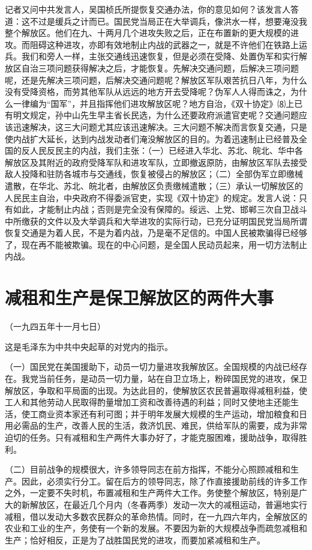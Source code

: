 \documentclass[UTF-8, a5paper, 12pt]{ctexart}
\begin{document}
记者又问中共发言人，吴国桢氏所提恢复交通办法，你的意见如何？该发言人答道：这不过是缓兵之计而已。国民党当局正在大举调兵，像洪水一样，想要淹没我整个解放区。他们在九、十两月几个进攻失败之后，正在布置新的更大规模的进攻。而阻碍这种进攻，亦即有效地制止内战的武器之一，就是不许他们在铁路上运兵。我们和旁人一样，主张交通线迅速恢复，但是必须在受降、处置伪军和实行解放区自治三项问题获得解决之后，才能恢复。先解决交通问题，后解决三项问题呢，还是先解决三项问题，后解决交通问题呢？解放区军队艰苦抗日八年，为什么没有受降资格，而劳其他军队从远远的地方开去受降呢？伪军人人得而诛之，为什么一律编为“国军”，并且指挥他们进攻解放区呢？地方自治，《双十协定》⑻上已有明文规定，孙中山先生早主省长民选，为什么还要政府派遣官吏呢？交通问题应该迅速解决，这三大问题尤其应该迅速解决。三大问题不解决而言恢复交通，只是使内战扩大延长，达到内战发动者们淹没解放区的目的。为着迅速制止已经普及全国的反人民反民主的内战，我们主张：（一）已经进入华北、苏北、皖北、华中各解放区及其附近的政府受降军队和进攻军队，立即撤返原防，由解放区军队去接受敌人投降和驻防各城市与交通线，恢复被侵占的解放区；（二）全部伪军立即缴械遣散，在华北、苏北、皖北者，由解放区负责缴械遣散；（三）承认一切解放区的人民民主自治，中央政府不得委派官吏，实现《双十协定》的规定。发言人说：只有如此，才能制止内战；否则是完全没有保障的。绥远、上党、邯郸三次自卫战斗中所缴获的文件以及大举调兵和大举进攻的实际行动，已充分证明国民党当局所谓恢复交通是为着人民，不是为着内战，乃是毫不足信的。中国人民被欺骗得已经够了，现在再不能被欺骗。现在的中心问题，是全国人民动员起来，用一切方法制止内战。

\section{减租和生产是保卫解放区的两件大事}

（一九四五年十一月七日）

这是毛泽东为中共中央起草的对党内的指示。

（一）国民党在美国援助下，动员一切力量进攻我解放区。全国规模的内战已经存在。我党当前任务，是动员一切力量，站在自卫立场上，粉碎国民党的进攻，保卫解放区，争取和平局面的出现。为达此目的，使解放区农民普遍取得减租利益，使工人和其他劳动人民取得酌量增加工资和改善待遇的利益；同时又使地主还能生活，使工商业资本家还有利可图；并于明年发展大规模的生产运动，增加粮食和日用必需品的生产，改善人民的生活，救济饥民、难民，供给军队的需要，成为非常迫切的任务。只有减租和生产两件大事办好了，才能克服困难，援助战争，取得胜利。

（二）目前战争的规模很大，许多领导同志在前方指挥，不能分心照顾减租和生产。因此，必须实行分工。留在后方的领导同志，除了作直接援助前线的许多工作之外，一定要不失时机，布置减租和生产两件大工作。务使整个解放区，特别是广大的新解放区，在最近几个月内（冬春两季）发动一次大的减租运动，普遍地实行减租，借以发动大多数农民群众的革命热情。同时，在一九四六年内，全解放区的农业和工业的生产，务使有一个新的发展。不要因为新的大规模战争而疏忽减租和生产；恰好相反，正是为了战胜国民党的进攻，而要加紧减租和生产。
\end{document}

